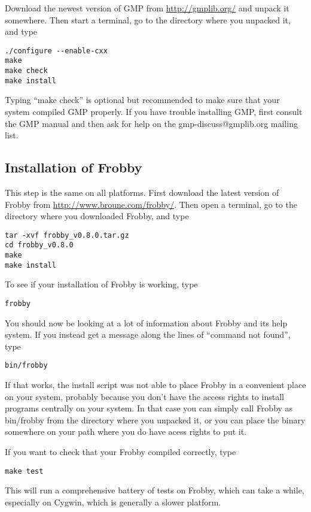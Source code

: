 \documentclass{amsart}
\theoremstyle{definition}
\begin{document}
Download the newest version of GMP from \url{http://gmplib.org/} and
unpack it somewhere. Then start a terminal, go to the directory where
you unpacked it, and type

\begin{verbatim}
./configure --enable-cxx
make
make check
make install
\end{verbatim}

Typing ``make check'' is optional but recommended to make sure that
your system compiled GMP properly. If you have trouble installing GMP,
first consult the GMP manual and then ask for help on the
gmp-discuss@gmplib.org mailing list.

\subsection{Installation of Frobby}

This step is the same on all platforms. First download the latest
version of Frobby from \url{http://www.broune.com/frobby/}. Then open
a terminal, go to the directory where you downloaded Frobby, and type
\begin{verbatim}
tar -xvf frobby_v0.8.0.tar.gz
cd frobby_v0.8.0
make
make install
\end{verbatim}

To see if your installation of Frobby is working, type
\begin{verbatim}
frobby
\end{verbatim}
You should now be looking at a lot of information about Frobby and its
help system. If you instead get a message along the lines of ``command
not found'', type
\begin{verbatim}
bin/frobby
\end{verbatim}
If that works, the install script was not able to place Frobby in a
convenient place on your system, probably because you don't have the
access rights to install programs centrally on your system. In that
case you can simply call Frobby as bin/frobby from the directory where
you unpacked it, or you can place the binary somewhere on your path
where you do have acess rights to put it.

If you want to check that your Frobby compiled correctly, type
\begin{verbatim}
make test
\end{verbatim}
This will run a comprehensive battery of tests on Frobby, which can
take a while, especially on Cygwin, which is generally a slower
platform.
\end{document}
